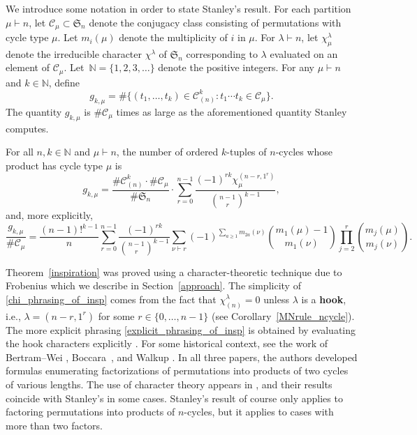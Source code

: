 \documentclass[Unicode,ALCO]{cedram}
\newcommand{\CC}{\mathcal{C}}
\newcommand{\N}{\mathbb{N}}
\newcommand{\FS}{\mathfrak{S}}
\newcommand{\myemph}{\textbf}
\begin{document}
We introduce some notation in order to state Stanley's result.
For each partition \(\mu \vdash n\),
let \(\CC_\mu \subset \FS_n\) denote the conjugacy class consisting of permutations with cycle type \(\mu\).
Let \(m_i (\mu) \) denote the multiplicity of \(i\) in \(\mu\).
For \(\lambda \vdash n\), let \(\chi^\lambda_\mu\) denote the irreducible character \(\chi^\lambda\) of \(\FS_n\) corresponding to \(\lambda\) evaluated on an element of \(\CC_\mu\).
Let~\(\N = \{1,2,3,\ldots\}\) denote the positive integers.
For any \(\mu \vdash n\) and \(k \in \N\), define
\begin{equation}
\label{g_kmu_defn}
g_{k,\mu} = \# \{(t_1,\ldots,t_k) \in \CC_{(n)}^k : t_1\cdots t_k \in \CC_\mu\}.
\end{equation}
The quantity \(g_{k,\mu}\) is \(\#\CC_\mu\) times as large as the aforementioned quantity Stanley computes.
\begin{theorem}
\label{inspiration}
For all \(n,k \in \N\) and \(\mu \vdash n\), the number of ordered \(k\)-tuples of \(n\)-cycles whose product has cycle type \(\mu\) is
\begin{equation}
\label{chi_phrasing_of_insp}
g_{k,\mu}
=
\frac{\# \CC_{(n)}^k \cdot \#\CC_\mu}{\# \FS_n}
\cdot
\sum_{r=0}^{n-1}
\frac{(-1)^{rk} \chi^{(n-r,1^r)}_\mu}{\binom{n-1}{r}^{k-1}},
\end{equation}
and, more explicitly,
\begin{equation}
\label{explicit_phrasing_of_insp}
\frac{g_{k,\mu}}{\# \CC_\mu}
=
\frac{(n-1)!^{k-1}}{n}
\sum_{r=0}^{n-1}
\frac{(-1)^{rk}}{\binom{n-1}{r}^{k-1}}
\sum_{\nu \vdash r}
(-1)^{\sum_{a \geq 1} m_{2a}(\nu)}
\binom{m_1(\mu)-1}{m_1(\nu)}
\prod_{j = 2}^{r}
\binom{m_j(\mu)}{m_j(\nu)}.
\end{equation}
\end{theorem}

Theorem~\ref{inspiration} was proved using a character-theoretic technique due to Frobenius which we describe in Section~\ref{approach}.
The simplicity of \eqref{chi_phrasing_of_insp} comes from the fact that \(\chi^\lambda_{(n)} = 0\) unless \(\lambda\) is a \myemph{hook}, i.e., \(\lambda = (n-r,1^r)\) for some \(r \in \{0,\ldots,n-1\}\) (see Corollary~\ref{MNrule_ncycle}).
The more explicit phrasing \eqref{explicit_phrasing_of_insp} is obtained by evaluating the hook characters explicitly \cite[Lemma~2.2]{ncycle}.
For some historical context, see the work of Bertram--Wei \cite{bertram_wei}, Boccara~\cite{boccara}, and Walkup \cite{walkup}.
In all three papers, the authors developed formulas enumerating factorizations of permutations into products of two cycles of various lengths.
The use of character theory appears in \cite[{Section~3}]{bertram_wei}, and their results coincide with Stanley's in some cases.
Stanley's result of course only applies to factoring permutations into products of \(n\)-cycles, but it applies to cases with more than two factors.
\end{document}

